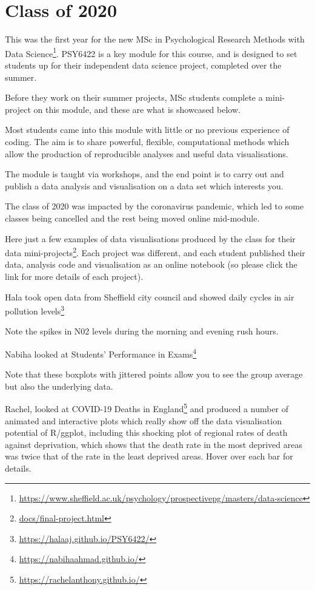 \documentclass[
  12pt,
  a5paper,
]{book}
\DeclareRobustCommand{\href}[2]{#2\footnote{\url{#1}}}
\begin{document}
\hypertarget{class-of-2020}{%
\chapter{Class of 2020}\label{class-of-2020}}

This was the first year for the new \href{https://www.sheffield.ac.uk/psychology/prospectivepg/masters/data-science}{MSc in Psychological Research Methods with Data Science}. PSY6422 is a key module for this course, and is designed to set students up for their independent data science project, completed over the summer.

Before they work on their summer projects, MSc students complete a mini-project on this module, and these are what is showcased below.

Most students came into this module with little or no previous experience of coding. The aim is to share powerful, flexible, computational methods which allow the production of reproducible analyses and useful data visualisations.

The module is taught via workshops, and the end point is to carry out and publish a data analysis and visualisation on a data set which interests you.

The class of 2020 was impacted by the coronavirus pandemic, which led to some classes being cancelled and the rest being moved online mid-module.

Here just a few examples of data visualisations produced by the class for their \href{docs/final-project.html}{data mini-projects}. Each project was different, and each student published their data, analysis code and visualisation as an online notebook (so please click the link for more details of each project).

Hala took open data from Sheffield city council and showed \href{https://halaaj.github.io/PSY6422/}{daily cycles in air pollution levels}

Note the spikes in N02 levels during the morning and evening rush hours.

Nabiha looked at \href{https://nabihaahmad.github.io/}{Students' Performance in Exams}

Note that these boxplots with jittered points allow you to see the group average but also the underlying data.

Rachel, looked at \href{https://rachelanthony.github.io/}{COVID-19 Deaths in England} and produced a number of animated and interactive plots which really show off the data visualisation potential of R/ggplot, including this shocking plot of regional rates of death against deprivation, which shows that the death rate in the most deprived areas was twice that of the rate in the least deprived areas. Hover over each bar for details.
\end{document}
